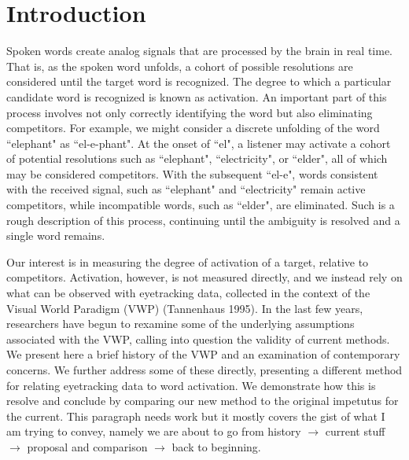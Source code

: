 \documentclass{article}
\begin{document}
\section{Introduction}

Spoken words create analog signals that are processed by the brain in real time. That is, as the spoken word unfolds, a cohort of possible resolutions are considered until the target word is recognized. The degree to which a particular candidate word is recognized is known as activation. An important part of this process involves not only correctly identifying the word but also eliminating competitors. For example, we might consider a discrete unfolding of the word ``elephant" as ``el-e-phant". At the onset of ``el", a listener may activate a cohort of potential resolutions such as ``elephant", ``electricity", or ``elder", all of which may be considered competitors. With the subsequent ``el-e", words consistent with the received signal, such as ``elephant" and ``electricity" remain active competitors, while incompatible words, such as ``elder", are eliminated. Such is a rough description of this process, continuing until the ambiguity is resolved and a single word remains.



Our interest is in measuring the degree of activation of a target, relative to competitors. Activation, however, is not measured directly, and we instead rely on what can be observed with eyetracking data, collected in the context of the Visual World Paradigm (VWP) (Tannenhaus 1995)\cite{tanenhaus1995integration}. In the last few years, researchers have begun to rexamine some of the underlying assumptions associated with the VWP, calling into question the validity of current methods. We present here a brief history of the VWP and an examination of contemporary concerns. We further address some of these directly, presenting a different method for relating eyetracking data to word activation. We demonstrate how this is resolve and conclude by comparing our new method to the original impetutus for the current. This paragraph needs work but it mostly covers the gist of what I am trying to convey, namely we are about to go from history $\rightarrow$ current stuff $\rightarrow$ proposal and comparison $\rightarrow$ back to beginning.

\end{document}
